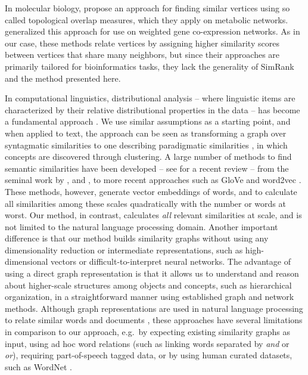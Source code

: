 \documentclass{kais}
\begin{document}
In molecular biology,  propose an approach for finding similar vertices using so called
topological overlap measures, which they apply on metabolic networks. 
generalized this approach for use on weighted gene co-expression networks. As in our case, these methods relate vertices by assigning
higher similarity scores between vertices that share many neighbors, but since their approaches are primarily tailored for bioinformatics tasks,
they lack the generality of SimRank and the method presented here.
  
In computational linguistics, distributional analysis -- where linguistic items are characterized by
their relative distributional properties in the data -- has become a fundamental approach \cite{Harris54}. We use
similar assumptions as a starting point, and when applied to text, the approach can be seen as transforming a graph
over syntagmatic similarities to one describing paradigmatic similarities \cite{Sahlgren-2006}, in which
concepts are discovered through clustering. A large number of methods to find semantic similarities have been
developed -- see \cite{Harispe2015} for a recent review -- from the seminal work by , and 
, to more recent approaches such as GloVe \cite{Pennington2014} and word2vec \cite{Mikolov-2013}. 
These methods, however, generate vector embeddings of words, and to calculate all similarities among these
scales quadratically with the number or words at worst. Our method, in contrast, calculates \emph{all} relevant
similarities at scale, and is not limited to the natural language processing domain.
Another important difference is that our method builds similarity graphs without 
using any dimensionality reduction or intermediate representations, such as high-dimensional vectors 
or difficult-to-interpret neural networks. The advantage of using a direct graph representation is that it allows us to
understand and reason about higher-scale structures among objects and concepts, such as hierarchical organization, in a straightforward 
manner using established graph and network methods. Although graph representations are used in natural language processing to relate 
similar words and documents \cite{Mihalcea2011}, these approaches have several limitations in comparison to our 
approach, e.g.\ by expecting existing similarity graphs as input, using ad hoc word relations (such as linking words separated 
by \emph{and} or \emph{or}), requiring part-of-speech tagged data, or by using human curated datasets, such as WordNet \cite{miller1995wordnet}.
\end{document}
